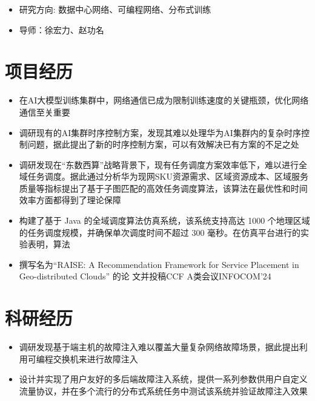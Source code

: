 \documentclass{resume}
\begin{document}
\begin{itemize}
  \item 研究方向: 数据中心网络、可编程网络、分布式训练
  \item 导师：徐宏力、赵功名
\end{itemize}


\section{项目经历}

\begin{itemize}[parsep=0.5ex]
  \item 在AI大模型训练集群中，网络通信已成为限制训练速度的关键瓶颈，优化网络通信至关重要
  \item 调研现有的AI集群时序控制方案，发现其难以处理华为AI集群内的复杂时序控制问题，据此提出了新的时序控制方案，可以有效解决已有方案的不足之处
\end{itemize}

\begin{itemize}[parsep=0.5ex]
  \item 调研发现在“东数西算”战略背景下，现有任务调度方案效率低下，难以进行全域任务调度。据此通过分析华为现网SKU资源需求、区域资源成本、区域服务质量等指标提出了基于子图匹配的高效任务调度算法，该算法在最优性和时间效率方面都得到了理论保障
  \item 构建了基于 Java 的全域调度算法仿真系统，该系统支持高达 1000 个地理区域的任务调度规模，并确保单次调度时间不超过 300 毫秒。在仿真平台进行的实验表明，算法
  \item 撰写名为“RAISE: A Recommendation Framework for Service Placement in Geo-distributed Clouds” 的论
  文并投稿CCF A类会议INFOCOM'24
\end{itemize}

\section{科研经历}

\begin{itemize}[parsep=0.5ex]
  \item 调研发现基于端主机的故障注入难以覆盖大量复杂网络故障场景，据此提出利用可编程交换机来进行故障注入
  \item 设计并实现了用户友好的多后端故障注入系统，提供一系列参数供用户自定义流量协议，并在多个流行的分布式系统任务中测试该系统并验证故障注入效果
\end{itemize}
\end{document}
